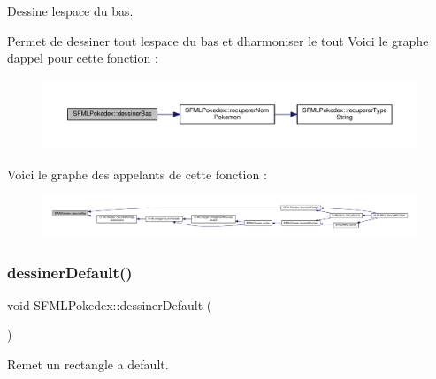 Dessine l\textquotesingle{}espace du bas. 

Permet de dessiner tout l\textquotesingle{}espace du bas et d\textquotesingle{}harmoniser le tout Voici le graphe d\textquotesingle{}appel pour cette fonction \+:\nopagebreak
\begin{figure}[H]
\begin{center}
\leavevmode
\includegraphics[width=350pt]{class_s_f_m_l_pokedex_a9760b492343dc3c07d49ec86f2160a95_cgraph}
\end{center}
\end{figure}
Voici le graphe des appelants de cette fonction \+:\nopagebreak
\begin{figure}[H]
\begin{center}
\leavevmode
\includegraphics[width=350pt]{class_s_f_m_l_pokedex_a9760b492343dc3c07d49ec86f2160a95_icgraph}
\end{center}
\end{figure}
\mbox{\label{class_s_f_m_l_pokedex_ae5f87a7a8a5cb0e6d151f15646d7e4af}} 
\subsubsection{\texorpdfstring{dessiner\+Default()}{dessinerDefault()}}
{\footnotesize\ttfamily void S\+F\+M\+L\+Pokedex\+::dessiner\+Default (\begin{DoxyParamCaption}{ }\end{DoxyParamCaption})\hspace{0.3cm}{\ttfamily [private]}}



Remet un rectangle a default. 

